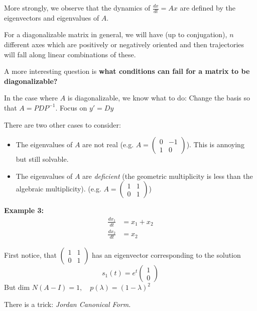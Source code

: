 \documentclass[12pt]{article}
\begin{document}
    More strongly, we observe that the dynamics of $\frac{dx}{dt} = Ax$ are defined by the eigenvectors and eigenvalues of $A$.

    For a diagonalizable matrix in general, we will have (up to conjugation), $n$ different axes which are positively or negatively oriented and then trajectories will fall along linear combinations of these. 

    A more interesting question is \textbf{what conditions can fail for a matrix to be diagonalizable?}
    
    In the case where $A$ is diagonalizable, we know what to do: Change the basis so that $A = PDP^{-1}$. Focus on $y' = Dy$ 

    There are two other cases to consider:
    \begin{itemize}
        \item The eigenvalues of $A$ are not real (e.g. $A = \begin{pmatrix}
            0 & -1\\ 
            1 & 0
        \end{pmatrix}$). This is annoying but still solvable. 

        \item The eigenvalues of $A$ are \emph{deficient} (the geometric multiplicity is less than the algebraic multiplicity). (e.g. $A = \begin{pmatrix}
            1 & 1\\
            0 & 1
        \end{pmatrix}$)
    \end{itemize}

    \textbf{Example 3:} 
    \begin{align*}
        \frac{dx_1}{dt} &= x_1 + x_2\\
        \frac{dx_2}{dt} &= x_2
    \end{align*}

    First notice, that $\begin{pmatrix}
        1 & 1\\ 
        0 & 1
    \end{pmatrix}$ has an eigenvector corresponding to the solution 
    \[s_1(t) = e^t \begin{pmatrix}
        1\\0
    \end{pmatrix}\]
    But $\text{dim } N(A - I) = 1, \quad p(\lambda) = (1 - \lambda)^2$ 

    There is a trick: \emph{Jordan Canonical Form.} 
\end{document}
